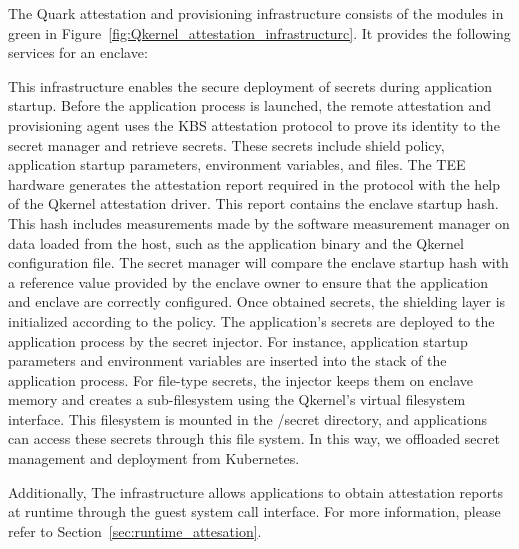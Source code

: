 The Quark attestation and provisioning infrastructure consists of the modules in green in Figure~\ref{fig:Qkernel_attestation_infrastructurc}. It provides the following services for an enclave:

This infrastructure enables the secure deployment of secrets during application startup. Before the application process is launched, the remote attestation and provisioning agent uses the KBS attestation protocol to prove its identity to the secret manager and retrieve secrets. These secrets include shield policy, application startup parameters, environment 
variables, and files. The TEE hardware generates the attestation report required in the protocol with the help of the Qkernel attestation driver. This report contains the enclave startup hash. This hash includes measurements made by the software measurement manager on data loaded from the host, such as the application binary and the Qkernel configuration file. 
The secret manager will compare the enclave startup hash with a reference value provided by the enclave owner to ensure that the application and enclave are correctly configured. Once obtained secrets, the shielding layer is initialized according to the policy. The application's secrets are deployed to the application process by the secret injector. 
For instance, application startup parameters and environment variables are inserted into the stack of the application process. For file-type secrets, the injector keeps them on enclave memory and creates a sub-filesystem using the Qkernel's virtual filesystem interface. This filesystem is mounted in the /secret directory, and applications can access these secrets through this file system. In this way, we offloaded secret management and deployment from Kubernetes.

Additionally, The infrastructure allows applications to obtain attestation reports at runtime through the guest system call interface. For more information, please refer to Section~\ref{sec:runtime_attesation}.


